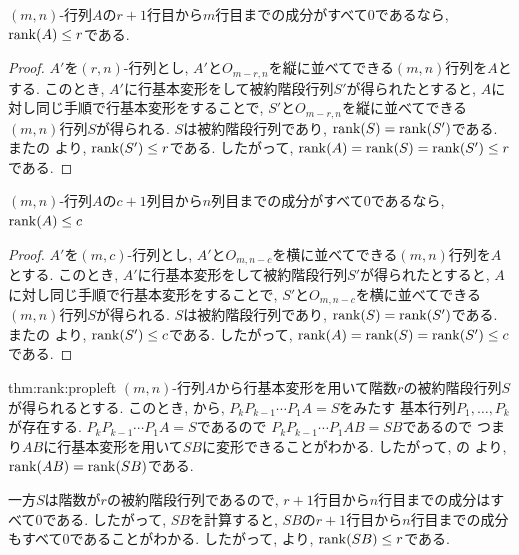 \begin{lemma}
  \label{lem:rank:rnonzerorows}
  $(m,n)$-行列$A$の$r+1$行目から$m$行目までの成分がすべて$0$であるなら,
  $\operatorname{rank}(A)\leq r$である.
\end{lemma}
\begin{proof}
  $A'$を$(r,n)$-行列とし,
  $A'$と$O_{m-r,n}$を縦に並べてできる$(m,n)$行列を$A$とする.
  このとき, $A'$に行基本変形をして被約階段行列$S'$が得られたとすると,
  $A$に対し同じ手順で行基本変形をすることで,
  $S'$と$O_{m-r,n}$を縦に並べてできる$(m,n)$行列$S$が得られる.
  $S$は被約階段行列であり, $\operatorname{rank}(S)=\operatorname{rank}(S')$である.
  またの
  より, $\operatorname{rank}(S')\leq r$である.
  したがって, $\operatorname{rank}(A)=\operatorname{rank}(S)=\operatorname{rank}(S')\leq r$である.
\end{proof}

\begin{lemma}
  \label{lem:rank:rnonzerocols}
  $(m,n)$-行列$A$の$c+1$列目から$n$列目までの成分がすべて$0$であるなら,
  $\operatorname{rank}(A)\leq c$
\end{lemma}
\begin{proof}
  $A'$を$(m,c)$-行列とし,
  $A'$と$O_{m,n-c}$を横に並べてできる$(m,n)$行列を$A$とする.
  このとき, $A'$に行基本変形をして被約階段行列$S'$が得られたとすると,
  $A$に対し同じ手順で行基本変形をすることで,
  $S'$と$O_{m,n-c}$を横に並べてできる$(m,n)$行列$S$が得られる.
  $S$は被約階段行列であり, $\operatorname{rank}(S)=\operatorname{rank}(S')$である.
  またの
  より, $\operatorname{rank}(S')\leq c$である.
  したがって, $\operatorname{rank}(A)=\operatorname{rank}(S)=\operatorname{rank}(S')\leq c$である.
\end{proof}


\begin{proofof*}{thm:rank:prop}{left}
  $(m,n)$-行列$A$から行基本変形を用いて階数$r$の被約階段行列$S$が得られるとする.
  このとき,
  から,
  $P_kP_{k-1}\cdots P_1A=S$をみたす
  基本行列$P_1,\ldots, P_k$が存在する.
  $P_kP_{k-1}\cdots P_1A=S$であるので
  $P_kP_{k-1}\cdots P_1AB=SB$であるので
  つまり$AB$に行基本変形を用いて$SB$に変形できることがわかる.
  したがって,
  の
  より, $\operatorname{rank}(AB)=\operatorname{rank}(SB)$である.
  
  一方$S$は階数が$r$の被約階段行列であるので,
  $r+1$行目から$n$行目までの成分はすべて$0$である.
  したがって,
  $SB$を計算すると,
  $SB$の$r+1$行目から$n$行目までの成分もすべて$0$であることがわかる.
  したがって, より,
  $\operatorname{rank}(SB)\leq r$である.
\end{proofof*}

